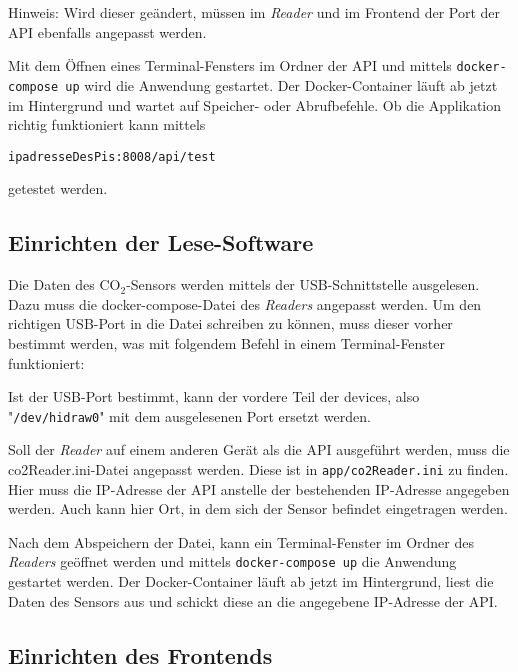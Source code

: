 \documentclass[a4paper,
    11pt,
    headings=small,
    ngerman,
    listof=totoc,
    numbers=noenddot]{scrreprt}[2021/11/13]
\begin{document}
Hinweis: Wird dieser geändert, müssen im \textit{Reader} und im Frontend der Port der \ac{API} ebenfalls angepasst werden.

Mit dem Öffnen eines Terminal-Fensters im Ordner der \ac{API} und mittels \texttt{docker-compose up} wird die Anwendung gestartet. Der Docker-Container läuft ab jetzt im Hintergrund und wartet auf Speicher- oder Abrufbefehle. Ob die Applikation richtig funktioniert kann mittels

\texttt{ipadresseDesPis:8008/api/test}

getestet werden.


\subsection{Einrichten der Lese-Software}

Die Daten des CO$_2$-Sensors werden mittels der USB-Schnittstelle ausgelesen. Dazu muss die docker-compose-Datei des \textit{Readers} angepasst werden. Um den richtigen USB-Port in die Datei schreiben zu können, muss dieser vorher bestimmt werden, was mit folgendem Befehl in einem Terminal-Fenster funktioniert:


Ist der USB-Port bestimmt, kann der vordere Teil der devices, also "\texttt{/dev/hidraw0}"  mit dem ausgelesenen Port ersetzt werden.



Soll der \textit{Reader} auf einem anderen Gerät als die \ac{API} ausgeführt werden, muss die co2Reader.ini-Datei angepasst werden. Diese ist in \texttt{app/co2Reader.ini} zu finden. Hier muss die IP-Adresse der \ac{API} anstelle der bestehenden IP-Adresse angegeben werden. Auch kann hier Ort, in dem sich der Sensor befindet eingetragen werden.

Nach dem Abspeichern der Datei, kann ein Terminal-Fenster im Ordner des \textit{Readers} geöffnet werden und mittels \texttt{docker-compose up} die Anwendung gestartet werden. Der Docker-Container läuft ab jetzt im Hintergrund, liest die Daten des Sensors aus und schickt diese an die angegebene IP-Adresse der \ac{API}.


\subsection{Einrichten des Frontends}
\end{document}

